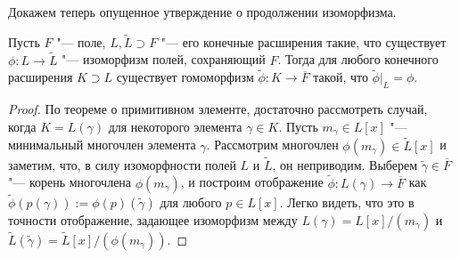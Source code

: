 Докажем теперь опущенное утверждение о продолжении изоморфизма.

\begin{proposition}
	Пусть $F$ "--- поле, $L, \widetilde{L} \supset F$ "--- его конечные расширения такие, что существует $\phi: L \to \widetilde{L}$ "--- изоморфизм полей, сохраняющий $F$. Тогда для любого конечного расширения $K \supset L$ существует гомоморфизм $\widetilde{\phi}: K \to \overline{F}$ такой, что $\widetilde\phi|_{L} = \phi$.
\end{proposition}

\begin{proof}
	По теореме о примитивном элементе, достаточно рассмотреть случай, когда $K = L(\gamma)$ для некоторого элемента $\gamma \in K$. Пусть $m_\gamma \in L[x]$ "--- минимальный многочлен элемента $\gamma$. Рассмотрим многочлен $\phi(m_\gamma) \in \widetilde{L}[x]$ и заметим, что, в силу изоморфности полей $L$ и $\widetilde{L}$, он неприводим. Выберем $\widetilde{\gamma} \in \overline{F}$ "--- корень многочлена $\phi(m_\gamma)$, и построим отображение $\widetilde{\phi}: L(\gamma) \to \overline{F}$ как $\widetilde{\phi}(p(\gamma)) := \phi(p)(\widetilde{\gamma})$ для любого $p \in L[x]$. Легко видеть, что это в точности отображение, задающее изоморфизм между $L(\gamma) = L[x] / (m_\gamma)$ и $\widetilde{L}(\widetilde{\gamma}) = \widetilde{L}[x] / (\phi(m_\gamma))$.
\end{proof}

